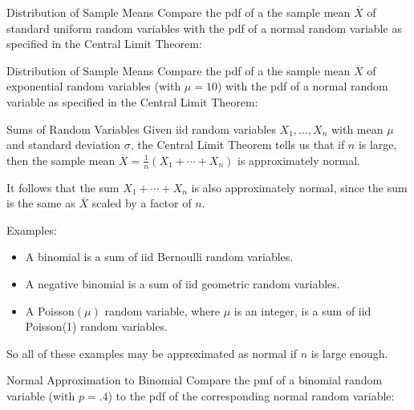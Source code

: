 \documentclass[handout]{beamer}
\begin{document}
\begin{frame}{Distribution of Sample Means}
Compare the pdf of a the sample mean $\overline{X}$ of standard uniform random variables with the pdf of a normal random variable as specified in the Central Limit Theorem:
\end{frame}

\begin{frame}{Distribution of Sample Means}
Compare the pdf of a the sample mean $\overline{X}$ of exponential random variables (with $\mu=10$) with the pdf of a normal random variable as specified in the Central Limit Theorem:
\end{frame}

\begin{frame}{Sums of Random Variables}
Given iid random variables $X_1,\dots, X_n$  with mean $\mu$ and standard deviation $\sigma$, the Central Limit Theorem tells us that if $n$ is large, then the sample mean $\overline{X}=\frac1n(X_1+\cdots+X_n)$ is approximately normal.

\vspace{.2cm}\pause
It follows that the sum $X_1+\cdots+X_n$ is also approximately normal, since the sum is the same as $\overline{X}$ scaled by a factor of $n$.

\vspace{.2cm}\pause 
Examples:
\begin{itemize}
\pause\item A binomial is a sum of iid Bernoulli random variables.
\pause\item A negative binomial is a sum of iid geometric random variables.
\pause\item A Poisson$(\mu)$ random variable, where $\mu$ is an integer, is a sum of iid Poisson(1) random variables.
\end{itemize}
\pause So all of these examples may be approximated as normal if $n$ is large enough.
\end{frame}

\begin{frame}{Normal Approximation to Binomial}
Compare the pmf of a binomial random variable (with $p=.4$) to the pdf of the corresponding normal random variable:
\end{frame}
\end{document}
